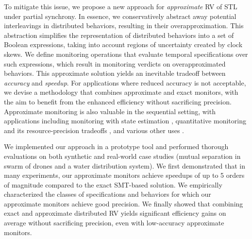 \documentclass[iicol,lineno]{sn-jnl}
\newcommand{\?}{\text{?}}
\begin{document}
	To mitigate this issue, we propose a new approach for \emph{approximate} RV of STL 
	under partial synchrony.
	In essence, we conservatively abstract away potential interleavings in distributed behaviors, resulting in their overapproximation.
	This abstraction simplifies the representation of distributed behaviors into a set of Boolean 
	expressions, taking into account regions of uncertainty created by clock skews.
	We define monitoring operations that evaluate temporal specifications over such expressions, 
	which result in monitoring verdicts on overapproximated behaviors.
	This approximate solution yields an inevitable tradeoff between {\em accuracy} and {\em speedup}.
	For applications where reduced accuracy is not acceptable, we devise a methodology that combines approximate and exact monitors, 
	with the aim to benefit from the enhanced efficiency without sacrificing 
	precision.
	Approximate monitoring is also valuable in the sequential setting, with applications including
	monitoring with state estimation \cite{StollerBSGHSZ11,BartocciG13},
	quantitative monitoring and its resource-precision tradeoffs \cite{HenzingerS21,HenzingerMS22,HenzingerMS23},
	and various other uses \cite{AlechinaDL14,AcetoAFIL21}.
	
	
	
	We implemented our approach in a prototype tool and performed thorough evaluations on both 
	synthetic and real-world case studies (mutual separation in swarm of drones and a water distribution 
	system).
	We first demonstrated that in many experiments, our approximate monitors achieve 
	speedups of up to 5 orders of magnitude compared to the exact SMT-based solution.
	We empirically characterized the classes of specifications and behaviors for which our approximate 
	monitors achieve good precision.
	We finally showed that combining exact and approximate distributed RV yields significant efficiency gains on average without sacrificing precision, even with low-accuracy approximate monitors.
	
	
\end{document}

